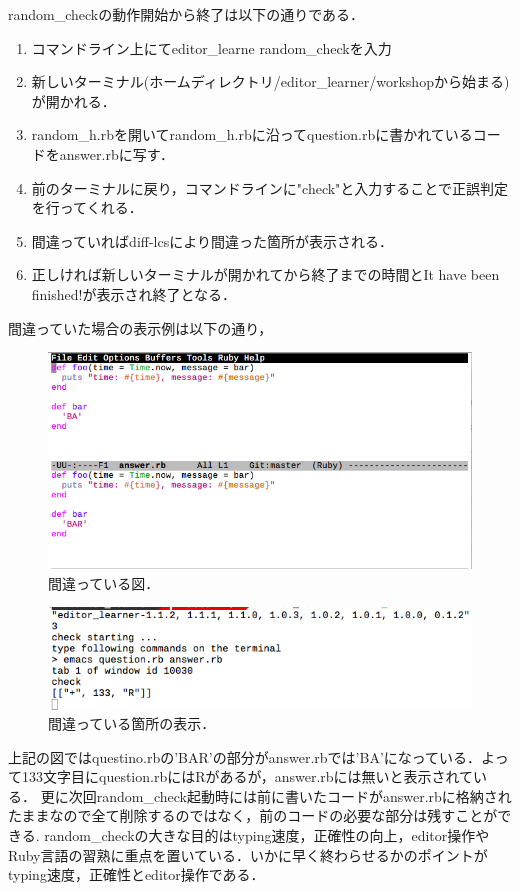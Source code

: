 random\_checkの動作開始から終了は以下の通りである．

\begin{enumerate}
\def\labelenumi{\arabic{enumi}.}
\tightlist
\item
  コマンドライン上にてeditor\_learne random\_checkを入力
\item
  新しいターミナル(ホームディレクトリ/editor\_learner/workshopから始まる)が開かれる．
\item
  random\_h.rbを開いてrandom\_h.rbに沿ってquestion.rbに書かれているコードをanswer.rbに写す．
\item
  前のターミナルに戻り，コマンドラインに"check"と入力することで正誤判定を行ってくれる．
\item
  間違っていればdiff-lcsにより間違った箇所が表示される．
\item
  正しければ新しいターミナルが開かれてから終了までの時間とIt have been
  finished!が表示され終了となる．
\end{enumerate}
間違っていた場合の表示例は以下の通り，
\begin{figure}[H]
\centering
\begin{center}
\includegraphics[width=150mm]{../../picture/diffp.png}
\end{center}
\caption{間違っている図．\label{sample}}
\end{figure}
\begin{figure}[H]
\centering
\begin{center}
\includegraphics[width=150mm]{../../picture/diff.png}
\end{center}
\caption{間違っている箇所の表示．\label{sample}}
\end{figure}
上記の図ではquestino.rbの'BAR'の部分がanswer.rbでは’BA'になっている．よって133文字目にquestion.rbにはRがあるが，answer.rbには無いと表示されている．
更に次回random\_check起動時には前に書いたコードがanswer.rbに格納されたままなので全て削除するのではなく，前のコードの必要な部分は残すことができる.
random\_checkの大きな目的はtyping速度，正確性の向上，editor操作やRuby言語の習熟に重点を置いている．いかに早く終わらせるかのポイントがtyping速度，正確性とeditor操作である．

